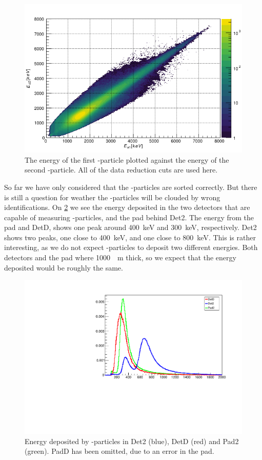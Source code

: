 \begin{figure}[h]
	\centering
	\includegraphics[width=\linewidth]{../figures/EE.png}
	\caption{The energy of the first \al-particle plotted against the energy of the second \al-particle. All of the data reduction cuts are used here.}
	\label{fig:EEAllCuts}
\end{figure}

So far we have only considered that the \al-particles are sorted correctly. But there is still a question for weather the \be-particles will be clouded by wrong identifications. 
On \cref{fig:beSpectrum} we see the energy deposited in the two detectors that are capable of measuring \be-particles, and the pad behind Det2.
The energy from the pad and DetD, shows one peak around \SI{400}{keV} and \SI{300}{keV}, respectively. 
Det2 shows two peaks, one close to \SI{400}{keV}, and one close to \SI{800}{keV}. This is rather interesting, as we do not expect \be-particles to deposit two different energies. Both detectors and the pad where \SI{1000}{\mu m} thick, so we expect that the energy deposited would be roughly the same. 



\begin{figure}[h]
	\centering
	\includegraphics[width=\linewidth]{../figures/betaSpec.pdf}
	\caption{Energy deposited by \be-particles in Det2 (blue), DetD (red) and Pad2 (green). PadD has been omitted, due to an error in the pad.}
	\label{fig:beSpectrum}
\end{figure}

